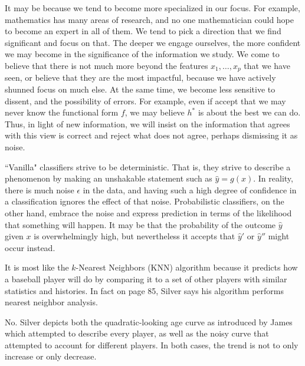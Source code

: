 \documentclass[12pt]{article}
\begin{document}
\begin{enumerate}
It may be because we tend to become more specialized in our focus. For example, mathematics
has many areas of research, and no one mathematician could hope to become an expert
in all of them. We tend to pick a direction that we find significant and focus on
that. The deeper we engage ourselves, the more confident we may become in the significance
of the information we study. We come to believe that there is not much more beyond
the features $x_1,\ldots,x_p$ that we have seen, or believe that they are the most impactful,
because we have actively shunned focus on much else. At the same time, we become
less sensitive to dissent, and the possibility of errors. For example, even if
accept that we may never know the functional form $f$, we may believe $h^*$
is about the best we can do. Thus, in light of new information, we will insist
on the information that agrees with this view is correct and reject what does not agree,
perhaps dismissing it as noise.


``Vanilla" classifiers strive to be deterministic. That is, they strive to describe a phenomenon
by making an unshakable statement such as $\hat{y}=g(x)$. In reality, there is much noise
$\epsilon$ in the data, and having such a high degree of confidence in a classification
ignores the effect of that noise. Probabilistic classifiers, on the other hand, embrace the
noise and express prediction in terms of the likelihood that something will happen.
It may be that the probability of the outcome $\hat{y}$ given $x$ is overwhelmingly high,
but nevertheless it accepts that $\hat{y}'$ or $\hat{y}''$ might occur instead.


It is most like the $k$-Nearest Neighbors (KNN) algorithm because it predicts how a baseball
player will do by comparing it to a set of other players with similar statistics and histories.
In fact on page 85, Silver says his algorithm performs nearest neighbor analysis.


No. Silver depicts both the quadratic-looking age curve as introduced by James which attempted
to describe every player, as well as the noisy curve that attempted to account for different
players. In both cases, the trend is not to only increase or only decrease.


\end{enumerate}
\end{document}
